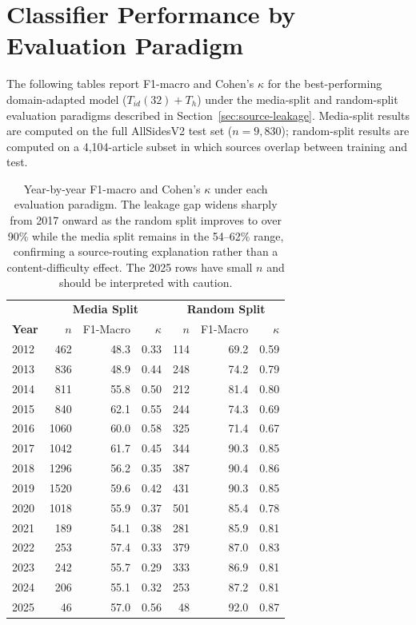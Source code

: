 \section{Classifier Performance by Evaluation Paradigm}
\label{appendix:leakage-stats}

The following tables report F1-macro and Cohen's $\kappa$ for the best-performing domain-adapted model ($T_{id}(32){+}T_h$) under the media-split and random-split evaluation paradigms described in Section~\ref{sec:source-leakage}. Media-split results are computed on the full AllSidesV2 test set ($n=9{,}830$); random-split results are computed on a 4,104-article subset in which sources overlap between training and test.

\begin{table}[ht]
\centering
\small
\begin{tabular}{lrrrrrr}
\toprule
 & \multicolumn{3}{c}{\textbf{Media Split}} & \multicolumn{3}{c}{\textbf{Random Split}} \\
\textbf{Year} & $n$ & F1-Macro & $\kappa$ & $n$ & F1-Macro & $\kappa$ \\
\midrule
2012 & 462  & 48.3 & 0.33 & 114 & 69.2 & 0.59 \\
2013 & 836  & 48.9 & 0.44 & 248 & 74.2 & 0.79 \\
2014 & 811  & 55.8 & 0.50 & 212 & 81.4 & 0.80 \\
2015 & 840  & 62.1 & 0.55 & 244 & 74.3 & 0.69 \\
2016 & 1060 & 60.0 & 0.58 & 325 & 71.4 & 0.67 \\
2017 & 1042 & 61.7 & 0.45 & 344 & 90.3 & 0.85 \\
2018 & 1296 & 56.2 & 0.35 & 387 & 90.4 & 0.86 \\
2019 & 1520 & 59.6 & 0.42 & 431 & 90.3 & 0.85 \\
2020 & 1018 & 55.9 & 0.37 & 501 & 85.4 & 0.78 \\
2021 & 189  & 54.1 & 0.38 & 281 & 85.9 & 0.81 \\
2022 & 253  & 57.4 & 0.33 & 379 & 87.0 & 0.83 \\
2023 & 242  & 55.7 & 0.29 & 333 & 86.9 & 0.81 \\
2024 & 206  & 55.1 & 0.32 & 253 & 87.2 & 0.81 \\
2025 & 46   & 57.0 & 0.56 & 48  & 92.0 & 0.87 \\
\bottomrule
\end{tabular}
\caption{Year-by-year F1-macro and Cohen's $\kappa$ under each evaluation paradigm. The leakage gap widens sharply from 2017 onward as the random split improves to over 90\% while the media split remains in the 54--62\% range, confirming a source-routing explanation rather than a content-difficulty effect. The 2025 rows have small $n$ and should be interpreted with caution.}
\label{tab:year_leakage}
\end{table}


